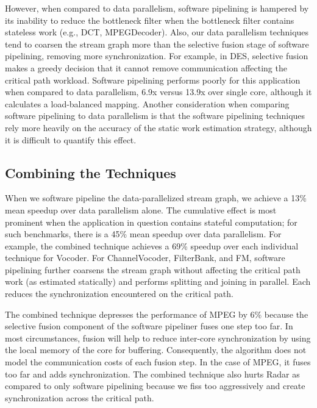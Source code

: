 However, when compared to data parallelism, software pipelining is
hampered by its inability to reduce the bottleneck filter when the
bottleneck filter contains stateless work (e.g., DCT, MPEGDecoder).  Also,
our data parallelism techniques tend to coarsen the stream graph more
than the selective fusion stage of software pipelining, removing more
synchronization.  For example, in DES, selective fusion makes a greedy
decision that it cannot remove communication affecting the critical
path workload.  Software pipelining performs poorly for this
application when compared to data parallelism, 6.9x versus 13.9x over
single core, although it calculates a load-balanced mapping.  Another
consideration when comparing software pipelining to data parallelism
is that the software pipelining techniques rely more heavily on the
accuracy of the static work estimation strategy, although it is
difficult to quantify this effect.

\subsection{Combining the Techniques}
When we software pipeline the data-parallelized stream graph, we
achieve a 13\% mean speedup over data parallelism alone. The
cumulative effect is most prominent when the application in question
contains stateful computation; for such benchmarks, there is a
45\% mean speedup over data parallelism.  For
example, the combined technique achieves a 69\% speedup over each
individual technique for Vocoder. For ChannelVocoder, FilterBank, and
FM, software pipelining further coarsens the stream graph without
affecting the critical path work (as estimated statically) and
performs splitting and joining in parallel.  Each reduces the
synchronization encountered on the critical path.

The combined technique depresses the performance of MPEG by 6\%
because the selective fusion component of the software pipeliner fuses
one step too far.  In most circumstances, fusion will help to reduce
inter-core synchronization by using the local memory of the core for
buffering. Consequently, the algorithm does not model the
communication costs of each fusion step. In the case of MPEG, it fuses
too far and adds synchronization. The combined technique also hurts
Radar as compared to only software pipelining because we fiss too
aggressively and create synchronization across the critical path.


